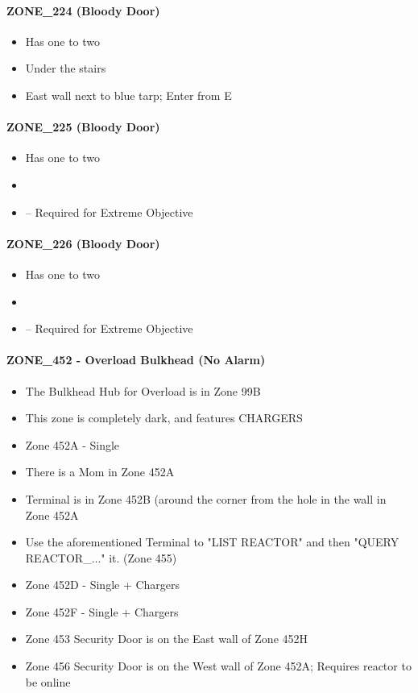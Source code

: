\paragraph{ZONE\_224 (Bloody Door)}
\begin{itemize}
    \item Has one to two \gtfoenemyscout{}
    \item {} Under the stairs
    \item {} East wall next to blue tarp; Enter from E
\end{itemize}

\paragraph{ZONE\_225 (Bloody Door)}
\begin{itemize}
    \item Has one to two \gtfoenemyscout{}
    \item {}
    \item {} -- Required for Extreme Objective
\end{itemize}

\paragraph{ZONE\_226 (Bloody Door)}
\begin{itemize}
    \item Has one to two \gtfoenemyscout{}
    \item {}
    \item {} -- Required for Extreme Objective
\end{itemize}

\paragraph{ZONE\_452 - Overload Bulkhead (No Alarm)}
\begin{itemize}
    \item The Bulkhead Hub for Overload is in Zone 99B
    \item This zone is completely dark, and features CHARGERS
    \item Zone 452A - Single \gtfoenemyscout{}
    \item There is a Mom in Zone 452A
    \item Terminal is in Zone 452B (around the corner from the hole in the wall in Zone 452A
    \item Use the aforementioned Terminal to "LIST REACTOR" and then "QUERY REACTOR\_..." it. (Zone 455)
    \item Zone 452D - Single \gtfoenemyscout{} + Chargers
    \item Zone 452F - Single \gtfoenemyscout{} + Chargers
    \item Zone 453 Security Door is on the East wall of Zone 452H
    \item Zone 456 Security Door is on the West wall of Zone 452A; Requires reactor to be online
\end{itemize}

